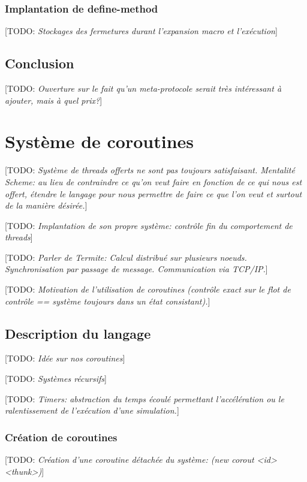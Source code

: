 \documentclass[12pt,oneside,letterpaper,francais]{book}
\newcommand{\todo}[1]{[TODO: {\it #1}]}
\begin{document}
\subsection{Implantation de define-method}
\todo{Stockages des fermetures durant l'expansion macro et l'exécution}




\section{Conclusion}
\todo{Ouverture sur le fait qu'un meta-protocole serait très intéressant à
  ajouter, mais à quel prix?}



\chapter{Système de coroutines}
\todo{Système de threads offerts ne sont pas toujours
  satisfaisant. Mentalité Scheme: au lieu de contraindre ce qu'on veut
  faire en fonction de ce qui nous est offert, étendre le langage pour
  nous permettre de faire ce que l'on veut et surtout de la manière
  désirée.}

\todo{Implantation de son propre système: contrôle fin du comportement
  de threads}

\todo{Parler de Termite: Calcul distribué sur plusieurs
  noeuds. Synchronisation par passage de message. Communication via
  TCP/IP.}

\todo{Motivation de l'utilisation de coroutines (contrôle exact sur le
  flot de contrôle == système toujours dans un état consistant).}

\section{Description du langage}
\todo{Idée sur nos coroutines}

\todo{Systèmes récursifs}

\todo{Timers: abstraction du temps écoulé permettant l'accélération ou
  le ralentissement de l'exécution d'une simulation.}

\subsection{Création de coroutines}
\todo{Création d'une coroutine détachée du système: (new corout <id>
  <thunk>)}
\end{document}
